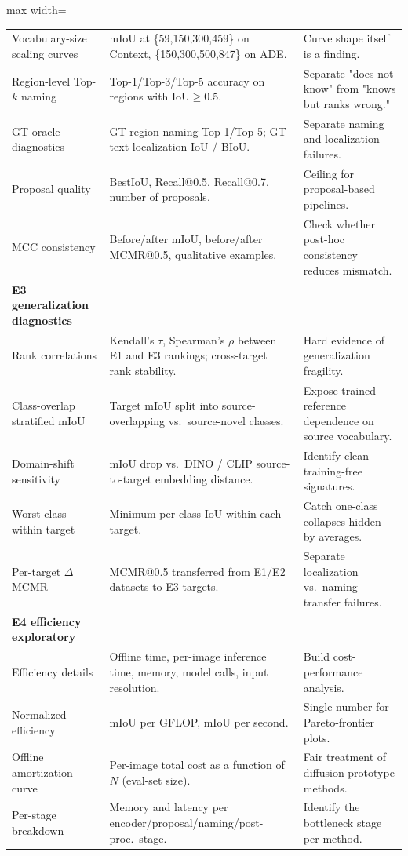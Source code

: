 \documentclass[11pt,a4paper]{article}
\begin{document}
\begin{table}[H]
\begin{adjustbox}{max width=\textwidth}
\begin{tabular}{p{} p{} p{}}
Vocabulary-size scaling curves & mIoU at \{59,150,300,459\} on Context, \{150,300,500,847\} on ADE. & Curve shape itself is a finding. \\
Region-level Top-$k$ naming & Top-1/Top-3/Top-5 accuracy on regions with $\mathrm{IoU}\ge 0.5$. & Separate "does not know" from "knows but ranks wrong." \\
GT oracle diagnostics & GT-region naming Top-1/Top-5; GT-text localization IoU / BIoU. & Separate naming and localization failures. \\
Proposal quality & BestIoU, Recall@0.5, Recall@0.7, number of proposals. & Ceiling for proposal-based pipelines. \\
MCC consistency & Before/after mIoU, before/after MCMR@0.5, qualitative examples. & Check whether post-hoc consistency reduces mismatch. \\
\midrule
\textbf{E3 generalization diagnostics} & & \\
Rank correlations & Kendall's $\tau$, Spearman's $\rho$ between E1 and E3 rankings; cross-target rank stability. & Hard evidence of generalization fragility. \\
Class-overlap stratified mIoU & Target mIoU split into source-overlapping vs.\ source-novel classes. & Expose trained-reference dependence on source vocabulary. \\
Domain-shift sensitivity & mIoU drop vs.\ DINO / CLIP source-to-target embedding distance. & Identify clean training-free signatures. \\
Worst-class within target & Minimum per-class IoU within each target. & Catch one-class collapses hidden by averages. \\
Per-target $\Delta$ MCMR & MCMR@0.5 transferred from E1/E2 datasets to E3 targets. & Separate localization vs.\ naming transfer failures. \\
\midrule
\textbf{E4 efficiency exploratory} & & \\
Efficiency details & Offline time, per-image inference time, memory, model calls, input resolution. & Build cost-performance analysis. \\
Normalized efficiency & mIoU per GFLOP, mIoU per second. & Single number for Pareto-frontier plots. \\
Offline amortization curve & Per-image total cost as a function of $N$ (eval-set size). & Fair treatment of diffusion-prototype methods. \\
Per-stage breakdown & Memory and latency per encoder/proposal/naming/post-proc.\ stage. & Identify the bottleneck stage per method. \\
\bottomrule
\end{tabular}
\end{adjustbox}
\end{table}
\end{document}

